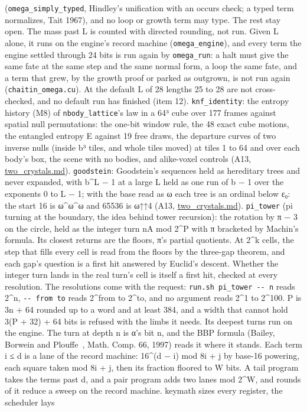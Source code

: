 \begin{description}
(\texttt{omega\_\allowbreak{}simply\_\allowbreak{}typed}, Hindley's unification with an occurs check; a typed term normalizes, Tait 1967), and no loop or growth term may type. The rest stay open. The mass past L is counted with directed rounding, not run. Given L alone, it runs on the engine's record machine (\texttt{omega\_\allowbreak{}engine}), and every term the engine settled through 24 bits is run again by \texttt{omega\_\allowbreak{}run}: a halt must give the same fate at the same step and the same normal form, a loop the same fate, and a term that grew, by the growth proof or parked as outgrown, is not run again (\texttt{chaitin\_\allowbreak{}omega.\allowbreak{}cu}). At the default L of 28 lengths 25 to 28 are not cross-checked, and no default run has finished (item 12). \texttt{knf\_\allowbreak{}identity}: the entropy history (M8) of \texttt{nbody\_\allowbreak{}lattice}'s law in a 64³ cube over 177 frames against spatial null permutations: the one-bit window rule, the 48 exact cube motions, the entangled entropy E against 19 free draws, the departure curves of two inverse nulls (inside b³ tiles, and whole tiles moved) at tiles 1 to 64 and over each body's box, the scene with no bodies, and alike-voxel controls (A13, \hyperref[chap:two-crystals]{two\_\allowbreak{}crystals.md}). \texttt{goodstein}: Goodstein's sequences held as hereditary trees and never expanded, with b\textasciicircum{}L − 1 at a large L held as one run of b − 1 over the exponents 0 to L − 1; with the base read as ω each tree is an ordinal below ε₀: the start 16 is ω\textasciicircum{}ω\textasciicircum{}ω and 65536 is ω↑↑4 (A13, \hyperref[chap:two-crystals]{two\_\allowbreak{}crystals.md}). \texttt{pi\_\allowbreak{}tower} (pi turning at the boundary, the idea behind tower recursion): the rotation by π − 3 on the circle, held as the integer turn nA mod 2\textasciicircum{}P with π bracketed by Machin's formula. Its closest returns are the floors, π's partial quotients. At 2\textasciicircum{}k cells, the step that fills every cell is read from the floors by the three-gap theorem, and each gap's question is a first hit answered by Euclid's descent. Whether the integer turn lands in the real turn's cell is itself a first hit, checked at every resolution. The resolutions come with the request: \texttt{run.\allowbreak{}sh pi\_\allowbreak{}tower -\allowbreak{}-\allowbreak{} n} reads 2\textasciicircum{}n, \texttt{-\allowbreak{}-\allowbreak{} from to} reads 2\textasciicircum{}from to 2\textasciicircum{}to, and no argument reads 2\textasciicircum{}1 to 2\textasciicircum{}100. P is 3n + 64 rounded up to a word and at least 384, and a width that cannot hold 3(P + 32) + 64 bits is refused with the limbs it needs. Its deepest turns run on the engine. The turn at depth n is α's bit n, and the BBP formula (Bailey, Borwein and Plouffe~\cite{src:Bailey-Borwein-and-Plouffe-1997}, Math. Comp. 66, 1997) reads it where it stands. Each term i ≤ d is a lane of the record machine: 16\textasciicircum{}(d − i) mod 8i + j by base-16 powering, each square taken mod 8i + j, then its fraction floored to W bits. A tail program takes the terms past d, and a pair program adds two lanes mod 2\textasciicircum{}W, and rounds of it reduce a sweep on the record machine. keymath sizes every register, the scheduler lays 
\end{description}
